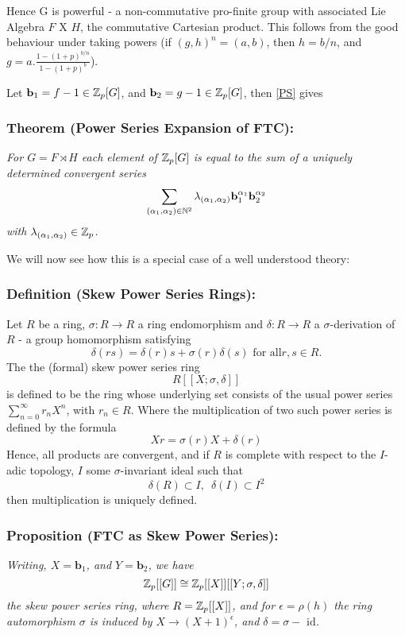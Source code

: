 Hence G is powerful - a non-commutative pro-finite group with associated Lie Algebra $F \text{ X } H$, the commutative Cartesian product. This follows from the good behaviour under taking powers (if $(g,h)^n = (a,b)$, then $h=b/n$, and $g=a.\frac{1-(1+p)^{b/n}}{1-(1+p)^b}$).

Let $\mathbf b_1 = f - 1\in \mathbb Z_p[G]$, and $\mathbf b_2 = g - 1\in \mathbb Z_p[G]$, then \ref{PS} gives 

\subsubsection{Theorem (Power Series Expansion of FTC):\label{PSFTC}}
\emph{For $G = F  \rtimes H$ each element of $\mathbb Z_p [G]$ is equal to the sum of a uniquely determined convergent series
$$\sum_{(\alpha_1,\alpha_2)\in \mathbb N^2} \lambda_{(\alpha_1,\alpha_2)} \mathbf b_1^{\alpha_1} \mathbf b_2 ^{\alpha_2}$$
with $\lambda_{(\alpha_1,\alpha_2)} \in\mathbb Z_p$. }

\bigskip

We will now see how this is a special case of a well understood theory:
\subsubsection{Definition (Skew Power Series Rings):}
Let $R$ be a ring, $\sigma:R\rightarrow R$ a ring endomorphism and $\delta:R\rightarrow R$ a $\sigma$-derivation of $R$ - a group homomorphism satisfying
$$\delta(rs) = \delta(r) s + \sigma(r) \delta (s) \text{  for all}r,s\in R.$$
The the (formal) skew power series ring
$$R[[X;\sigma,\delta]]$$
is defined to be the ring whose underlying set consists of the usual power series $\sum_{n=0}^{\infty} r_n X^n$, with $r_n \in R$. Where the multiplication of two such power series is defined by the formula
$$Xr = \sigma(r) X +\delta(r)$$
Hence, all products are convergent, and if $R$ is complete with respect to the $I$-adic topology, $I$ some $\sigma$-invariant ideal such that $$\delta(R)\subset I,\,\,\,\delta(I)\subset I^2$$
then multiplication is uniquely defined.


\subsubsection{Proposition (FTC as Skew Power Series):\label{FTCPS}}
\emph{Writing, $X=\mathbf b_1$, and $Y = \mathbf b_2$, we have $$\mathbb Z_p [[G]] \cong \mathbb Z_p [[X]]  [[Y; \sigma, \delta]]$$ the skew power series ring, where $R = \mathbb Z_p[[X]]$, and for $\epsilon = \rho(h)$ the ring automorphism $\sigma$ is induced by $X \rightarrow (X+1)^\epsilon$, and $\delta = \sigma - \text{ id}$.}

